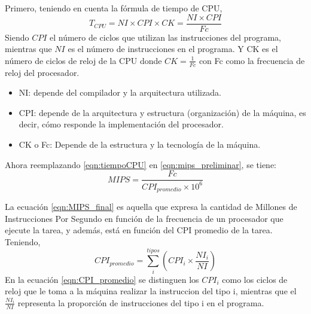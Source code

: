 Primero, teniendo en cuenta la fórmula de tiempo de CPU,
\begin{equation}
\label{eqn:tiempoCPU}
T_{CPU} = NI \times CPI \times CK = \frac{NI \times CPI}{Fc}
\end{equation}
Siendo $CPI$ el número de ciclos que utilizan las instrucciones del programa, mientras que $NI$ es el número de instrucciones en el programa. Y CK es el número de ciclos de reloj de la CPU donde $CK = \frac{1}{Fc}$ con Fc como la frecuencia de reloj del procesador.
\begin{itemize}
\item NI: depende del compilador y la arquitectura utilizada.
\item CPI: depende de la arquitectura y estructura (organización) de la máquina, es decir, cómo responde la implementación del procesador.
\item CK o Fc: Depende de la estructura y la tecnología de la máquina.
\end{itemize}
Ahora reemplazando \ref{eqn:tiempoCPU} en \ref{eqn:mips_preliminar}, se tiene:
\begin{equation}
\label{eqn:MIPS_final}
MIPS = \frac{Fc}{CPI_{promedio} \times 10^6}
\end{equation}

La ecuación \ref{eqn:MIPS_final} es aquella que expresa la cantidad de Millones de Instrucciones Por Segundo en función de la frecuencia de un procesador que ejecute la tarea, y además, está en función del CPI promedio de la tarea.
Teniendo,
\begin{equation}
\label{eqn:CPI_promedio}
CPI_{promedio} = \sum\limits_{i}^{tipos} ({CPI_i \times \frac{NI_i}{NI}})
\end{equation}
En la ecuación \ref{eqn:CPI_promedio} se distinguen los $CPI_i$ como los ciclos de reloj que le toma a la máquina realizar la instruccion del tipo i, mientras que el $\frac{NI_i}{NI}$ representa la proporción de instrucciones del tipo i en el programa.
